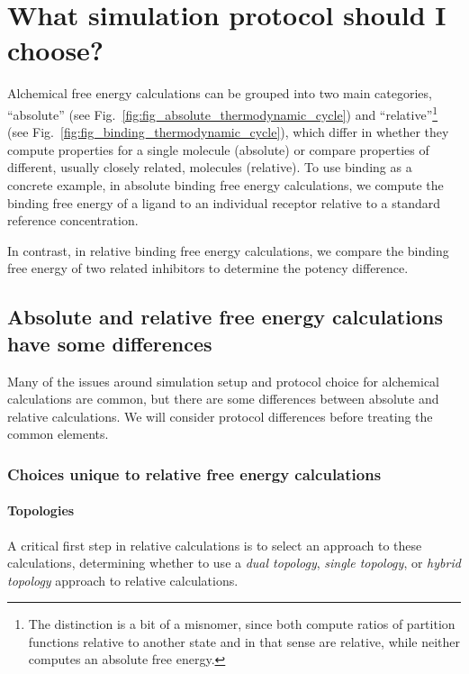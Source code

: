 \documentclass[9pt,bestpractices]{livecoms}
\begin{document}
\section{What simulation protocol should I choose?}
\label{sec:simulation_protocol_choice}
Alchemical free energy calculations can be grouped into two main categories, ``absolute'' (see Fig.~\ref{fig:fig_absolute_thermodynamic_cycle}) and ``relative''\footnote{The distinction is a bit of a misnomer, since both compute ratios of partition functions relative to another state and in that sense are relative, while neither computes an absolute free energy.} (see Fig.~\ref{fig:fig_binding_thermodynamic_cycle}), which differ in whether they compute properties for a single molecule (absolute) or compare properties of different, usually closely related, molecules (relative).
To use binding as a concrete example, in absolute binding free energy calculations, we compute the binding free energy of a ligand to an individual receptor relative to a standard reference concentration.

In contrast, in relative binding free energy calculations, we compare the binding free energy of two related inhibitors to determine the potency difference.

\subsection{Absolute and relative free energy calculations have some differences}
Many of the issues around simulation setup and protocol choice for alchemical calculations are common, but there are some differences between absolute and relative calculations. We will consider protocol differences before treating the common elements.

\subsubsection{Choices unique to relative free energy calculations}
\label{sec:relative-fe-protocol}

\paragraph{Topologies} 
A critical first step in relative calculations is to select an approach to these calculations, determining whether to use a \emph{dual topology}, \emph{single topology}, or \emph{hybrid topology} approach to relative calculations.
\end{document}
